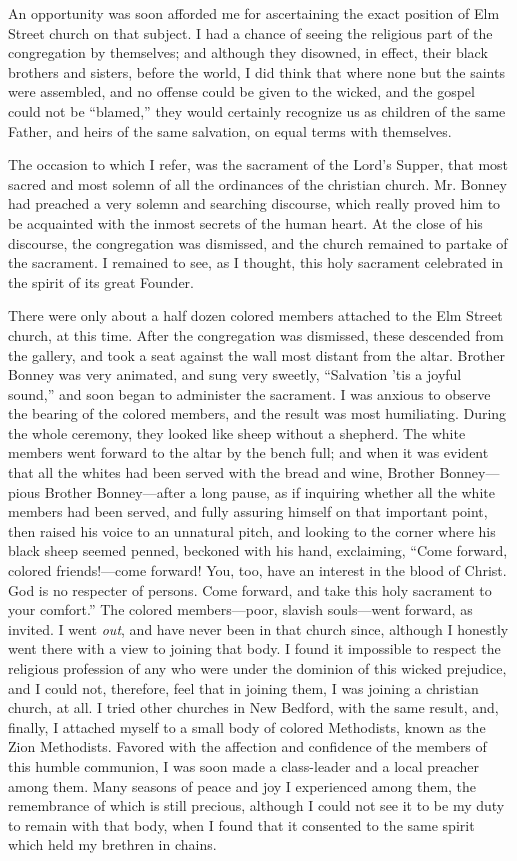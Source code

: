 An opportunity was soon afforded me for ascertaining the exact position
of Elm Street church on that subject. I had a chance of seeing the
religious part of the congregation by themselves; and although they
disowned, in effect, their black brothers and sisters, before the world,
I did think that where none but the saints were assembled, and no
offense could be given to the wicked, and the gospel could not be
``blamed,'' they would certainly recognize us as children of the same
Father, and heirs of the same salvation, on equal terms with themselves.

The occasion to which I refer, was the sacrament of the Lord's Supper,
that most sacred and most solemn of all the ordinances of the christian
church. Mr. Bonney had preached a very solemn and searching discourse,
which really proved him to be acquainted with the inmost secrets of the
human heart. At the close of his discourse, the congregation was
dismissed, and the church remained to partake of the sacrament. I
remained to see, as I thought, this holy sacrament celebrated in the
spirit of its great Founder.

There were only about a half dozen colored members attached to the Elm
Street church, at this time. After the congregation was dismissed, these
descended from the gallery, and took a seat against the wall most
distant from the altar. Brother Bonney was very animated, and sung very
sweetly, ``Salvation 'tis a joyful sound,'' and soon began to administer
the sacrament. I was anxious to observe the {}bearing of the colored
members, and the result was most humiliating. During the whole ceremony,
they looked like sheep without a shepherd. The white members went
forward to the altar by the bench full; and when it was evident that all
the whites had been served with the bread and wine, Brother
Bonney---pious Brother Bonney---after a long pause, as if inquiring
whether all the white members had been served, and fully assuring
himself on that important point, then raised his voice to an unnatural
pitch, and looking to the corner where his black sheep seemed penned,
beckoned with his hand, exclaiming, ``Come forward, colored
friends!---come forward! You, too, have an interest in the blood of
Christ. God is no respecter of persons. Come forward, and take this holy
sacrament to your comfort.'' The colored members---poor, slavish
souls---went forward, as invited. I went \emph{out}, and have never been
in that church since, although I honestly went there with a view to
joining that body. I found it impossible to respect the religious
profession of any who were under the dominion of this wicked prejudice,
and I could not, therefore, feel that in joining them, I was joining a
christian church, at all. I tried other churches in New Bedford, with
the same result, and, finally, I attached myself to a small body of
colored Methodists, known as the Zion Methodists. Favored with the
affection and confidence of the members of this humble communion, I was
soon made a class-leader and a local preacher among them. Many seasons
of peace and joy I experienced among them, the remembrance of which is
still precious, although {}I could not see it to be my duty to remain
with that body, when I found that it consented to the same spirit which
held my brethren in chains.

